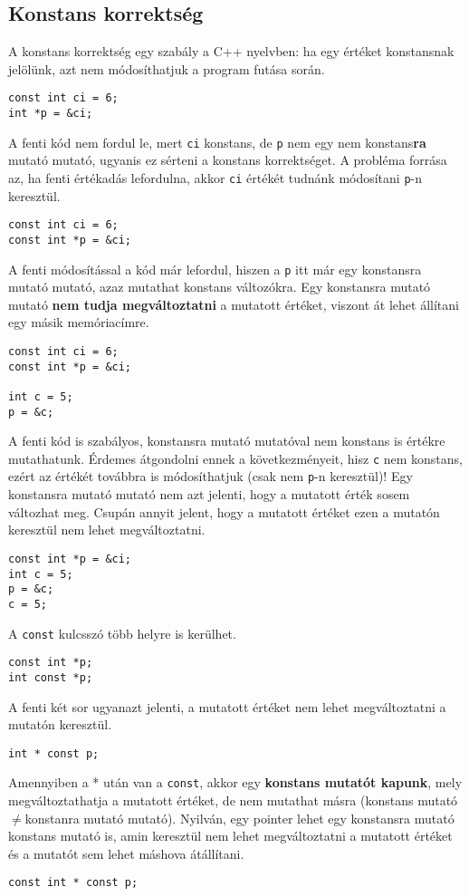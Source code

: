 \documentclass[../cpp_book/cpp_book.tex]{subfiles}
\begin{document}
	\subsection{Konstans korrektség}
	A konstans korrektség egy szabály a C++ nyelvben: ha egy értéket konstansnak jelölünk, azt nem módosíthatjuk a program futása során.
	\begin{lstlisting}
const int ci = 6;
int *p = &ci;
	\end{lstlisting}
	A fenti kód nem fordul le, mert \texttt{ci} konstans, de \texttt{p} nem egy nem konstans\textbf{ra} mutató mutató, ugyanis ez sérteni a konstans korrektséget. A probléma forrása az, ha fenti értékadás lefordulna, akkor \texttt{ci} értékét tudnánk módosítani \texttt{p}-n keresztül.
	\begin{lstlisting}
const int ci = 6;
const int *p = &ci;
	\end{lstlisting}
	A fenti módosítással a kód már lefordul, hiszen a \texttt{p} itt már egy konstansra mutató mutató, azaz mutathat konstans változókra. Egy konstansra mutató mutató \textbf{nem tudja megváltoztatni} a mutatott értéket, viszont át lehet állítani egy másik memóriacímre.
	\begin{lstlisting}
const int ci = 6;
const int *p = &ci;

int c = 5;
p = &c;
	\end{lstlisting}
	A fenti kód is szabályos, konstansra mutató mutatóval nem konstans is értékre mutathatunk. Érdemes átgondolni ennek a következményeit, hisz \texttt{c} nem konstans, ezért az értékét továbbra is módosíthatjuk (csak nem \texttt{p}-n keresztül)! Egy konstansra mutató mutató nem azt jelenti, hogy a mutatott érték sosem változhat meg. Csupán annyit jelent, hogy a mutatott értéket ezen a mutatón keresztül nem lehet megváltoztatni.
	\begin{lstlisting}
const int *p = &ci;
int c = 5;
p = &c;
c = 5;
	\end{lstlisting}
	A \texttt{const} kulcsszó több helyre is kerülhet.
	\begin{lstlisting}
const int *p;
int const *p;
	\end{lstlisting}
	A fenti két sor ugyanazt jelenti, a mutatott értéket nem lehet megváltoztatni a mutatón keresztül.
	\begin{lstlisting}
int * const p;
	\end{lstlisting} 
	Amennyiben a * után van a \texttt{const}, akkor egy \textbf{konstans mutatót kapunk}, mely megváltoztathatja a mutatott értéket, de nem mutathat másra (konstans mutató\quad$\not=$\quad konstanra mutató mutató). Nyilván, egy pointer lehet egy konstansra mutató konstans mutató is, amin keresztül nem lehet megváltoztatni a mutatott értéket és a mutatót sem lehet máshova átállítani.
	\begin{lstlisting}
const int * const p;
	\end{lstlisting}
\end{document}
